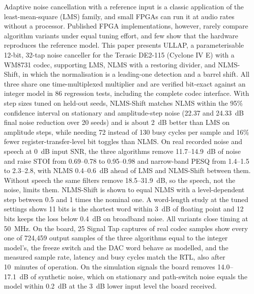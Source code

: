 Adaptive noise cancellation with a reference input is a classic application of the least-mean-square
(LMS) family, and small FPGAs can run it at audio rates without a processor. Published FPGA
implementations, however, rarely compare algorithm variants under equal tuning effort, and few show
that the hardware reproduces the reference model. This paper presents ULLAP, a parameterisable
12-bit, 32-tap noise canceller for the Terasic DE2-115 (Cyclone IV E) with a WM8731 codec,
supporting LMS, NLMS with a restoring divider, and NLMS-Shift, in which the normalisation is a
leading-one detection and a barrel shift. All three share one time-multiplexed multiplier and are
verified bit-exact against an integer model in 86 regression tests, including the complete
codec interface. With step sizes tuned on held-out seeds, NLMS-Shift matches NLMS within the 95\%
confidence interval on stationary and amplitude-step noise (22.37 and 24.33~dB final noise
reduction over 20 seeds) and is about 2~dB better than LMS on amplitude steps, while needing 72
instead of 130 busy cycles per sample and 16\% fewer register-transfer-level bit toggles than NLMS.
On real recorded noise and speech at 0~dB input SNR, the three algorithms remove 11.7--14.9~dB of noise and raise STOI from 0.69--0.78 to 0.95--0.98 and narrow-band PESQ from 1.4--1.5 to 2.3--2.8, with NLMS 0.4--0.6~dB ahead of LMS and NLMS-Shift between them. Without speech the same filters remove 18.5--31.9~dB, so the speech, not the noise,
limits them. NLMS-Shift is shown to equal NLMS with a level-dependent step between 0.5 and 1 times the nominal one.
A word-length study at the tuned settings shows 11 bits is the shortest word within 3~dB of floating
point and 12 bits keeps the loss below 0.4~dB on broadband noise. All variants close timing at
50~MHz. On the board, 25 Signal Tap captures of real codec samples show every one of 724,459 output
samples of the three algorithms equal to the integer model's, the freeze switch and the DAC word behave
as modelled, and the measured sample rate, latency and busy cycles match the RTL, also after
10~minutes of operation. On the simulation signals the board removes 14.0--17.1~dB of synthetic noise,
which on stationary and path-switch noise equals the model within 0.2~dB at the 3~dB lower input level
the board received.
